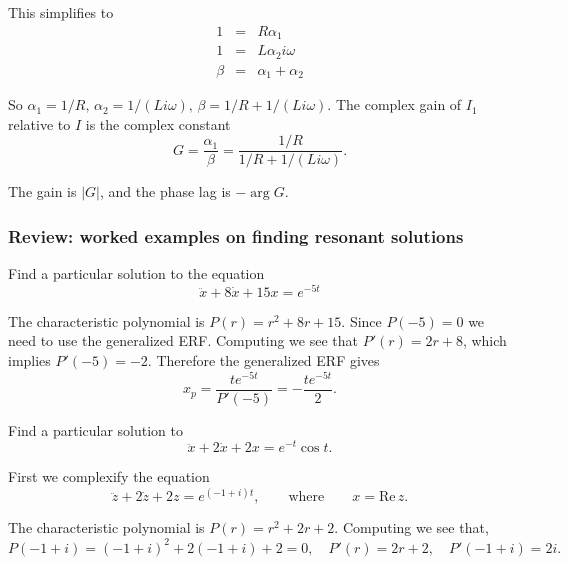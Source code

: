 This simplifies to
\begin{eqnarray*}
  1  &=& R \alpha _1 \\
  1  &=& L \alpha _2 i \omega \\
  \beta  &=&  \alpha _1  + \alpha _2 
\end{eqnarray*}

So $\alpha _1 = 1/R,\, \alpha _2 = 1/(L i \omega ),\, \beta = 1/R + 1/(L i \omega )$.
The complex gain of $I _1$ relative to $I$ is the complex constant
\begin{equation*}
  G = \frac{\alpha _1}{\beta } = \frac{1/R}{1/R + 1/(L i \omega )}.
\end{equation*}

The gain is $|G|$, and the phase lag is $-\arg G$.

\clearpage
\subsubsection{Review: worked examples on finding resonant solutions}

\begin{example}
  Find a particular solution to the equation
  \begin{equation*}
    \displaystyle  \ddot x + 8\dot x + 15 x = e^{-5t}
  \end{equation*}
\end{example}

The characteristic polynomial is $P(r) = r^2 + 8r + 15$.
Since $P(-5) = 0$ we need to use the generalized ERF. Computing we see that
$P'(r) = 2r + 8$, which implies $P'(-5) = -2$.
Therefore the generalized ERF gives
\begin{equation*}
  x_ p = \frac{te^{-5t}}{P'(-5)} = -\frac{te^{-5t}}{2}.
\end{equation*}

\begin{example}
  Find a particular solution to
  \begin{equation*}
    \ddot x + 2\dot x + 2x = e^{-t}\cos t.
  \end{equation*}
\end{example}

First we complexify the equation
\begin{equation*}
  \ddot z + 2\dot z + 2z = e^{(-1+i)t},
  \qquad \text {where} \qquad x = \mathrm{Re\, }z.
\end{equation*}

The characteristic polynomial is $P(r) = r^2 + 2r +2$.
Computing we see that,
\begin{equation*}
  P(-1+i) = (-1+i)^2 + 2(-1+i) + 2 = 0,
  \quad P'(r) = 2r + 2,
  \quad P'(-1+i) = 2i.
\end{equation*}

